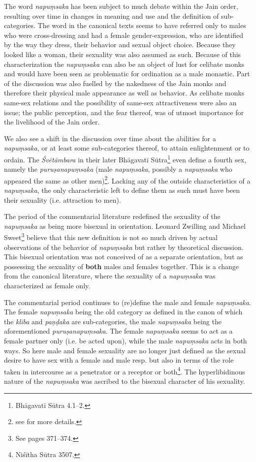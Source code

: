 The word {\em napuṃsaka} has been subject to much debate within the Jain order, resulting over time in changes in meaning and use and the definition of sub-categories. The word in the canonical texts seems to have referred only to males who were cross-dressing and had a female gender-expression, who are identified by the way they dress, their behavior and sexual object choice. Because they looked like a woman, their sexuality was also assumed as such. Because of this characterization the {\em napuṃsaka} can also be an object of lust for celibate monks and would have been seen as problematic for ordination as a male monastic. Part of the discussion was also fuelled by the nakedness of the Jain monks and therefore their physical male appearance as well as behavior. As celibate monks same-sex relations and the possibility of same-sex attractiveness were also an issue; the public perception, and the fear thereof, was of utmost importance for the livelihood of the Jain order. 

We also see a shift in the discussion over time about the abilities for a {\em napuṃsaka}, or at least some sub-categories thereof, to attain enlightenment or to ordain. The {\em Śvētāmbara} in their later Bhāgavatī Sūtra\footnote{Bhāgavatī Sūtra 4.1–2.} even define a fourth sex, namely the {\em puruṣanapuṃsaka} (male {\em napuṃsaka}, possibly a {\em napuṃsaka} who appeared the same as other men)\footnote{see \cite{zwilling} for more details.}. Lacking any of the outside characteristics of a {\em napuṃsaka}, the only characteristic left to define them as such must have been their sexuality (i.e. attraction to men).

The period of the commentarial literature redefined the sexuality of the {\em napuṃsaka} as being more bisexual in orientation. Leonard Zwilling and Michael Sweet\footnote{See \cite{zwilling} pages 371–374.} believe that this new definition is not so much driven by actual observations of the behavior of {\em napuṃsaka} but rather by theoretical discussion. This bisexual orientation was not conceived of as a separate orientation, but as possessing the sexuality of \textbf{both} males and females together. This is a change from the canonical literature, where the sexuality of a {\em napuṃsaka} was characterized as female only.

The commentarial period continues to (re)define the male and female {\em napuṃsaka}. The female {\em napuṃsaka} being the old category as defined in the canon of which the {\em klība} and {\em paṇḍaka} are sub-categories, the male {\em napuṃsaka} being the aforementioned {\em puruṣanapuṃsaka}. The female {\em napuṃsaka} seems to act as a female partner only (i.e. be acted upon), while the male {\em napuṃsaka} acts in both ways. So here male and female sexuality are no longer just defined as the sexual desire to have sex with a female and male resp. but also in terms of the role taken in intercourse as a penetrator or a receptor or both\footnote{Niśītha Sūtra 3507.}. The hyperlibidinous nature of the {\em napuṃsaka} was ascribed to the bisexual character of his sexuality.


